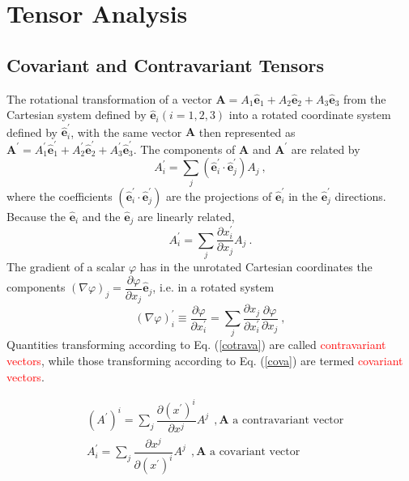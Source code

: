 \documentclass[11pt,a4paper]{article}
\renewcommand{\vec}[1]{\boldsymbol{#1}}
\begin{document}
\section{Tensor Analysis}
\subsection{Covariant and Contravariant Tensors}
\cite{arfken} The rotational transformation of a vector $\vec{A} = A_1\vec{\hat{e}}_1 + A_2\vec{\hat{e}}_2 +A_3\vec{\hat{e}}_3$ from the Cartesian system defined by $\vec{\hat{e}}_i (i = 1, 2, 3)$ into a rotated coordinate system defined by $\vec{\hat{e}}^\prime_i$, with the same vector $\vec{A}$ then represented as $\vec{A}^\prime = A^\prime_1\vec{\hat{e}}^\prime_1 + A^\prime_2\vec{\hat{e}}^\prime_2 + A^\prime_3\vec{\hat{e}}^\prime_3$. The components of $\vec{A}$ and $\vec{A}^\prime$ are related by
\begin{equation}
A^\prime_i = \sum_j (\vec{\hat{e}}^\prime_i \cdot \vec{\hat{e}}^\prime_j) A_j ~,
\end{equation}
where the coefficients $(\vec{\hat{e}}^\prime_i \cdot \vec{\hat{e}}^\prime_j)$ are the projections of $\vec{\hat{e}}^\prime_i$ in the $\vec{\hat{e}}^\prime_j$ directions. Because the $\vec{\hat{e}}_i$ and the $\vec{\hat{e}}_j$ are linearly related,
\begin{equation}
A^\prime_i = \sum_j \dfrac{\partial x_i^\prime}{\partial x_j} A_j ~.
\label{cotrava}
\end{equation}
The gradient of a scalar $\varphi$ has in the unrotated Cartesian coordinates the components $(\nabla \varphi)_j = \dfrac{\partial \varphi}{\partial x_j} \vec{\hat{e}}_j$, i.e. in a rotated system
\begin{equation}
(\nabla \varphi)^\prime_i \equiv \dfrac{\partial \varphi}{\partial x_i^\prime} = \sum_j \dfrac{\partial x_j}{\partial x^\prime_i} \dfrac{\partial \varphi}{\partial x_j} ~,
\label{cova}
\end{equation}
Quantities transforming according to Eq. (\ref{cotrava}) are called \textcolor{red}{contravariant vectors}, while those transforming according to Eq. (\ref{cova}) are termed \textcolor{red}{covariant vectors}. 

\begin{align}
& (A^\prime)^i = \sum_j \dfrac{\partial (x^\prime)^i}{\partial x^j} A^j  ~~, \text{$\vec{A}$ a contravariant vector} \\
& A^\prime_i = \sum_j \dfrac{\partial x^j}{\partial (x^\prime)^i} A^j  ~~, \text{$\vec{A}$ a covariant vector} 
\end{align}
\end{document}
